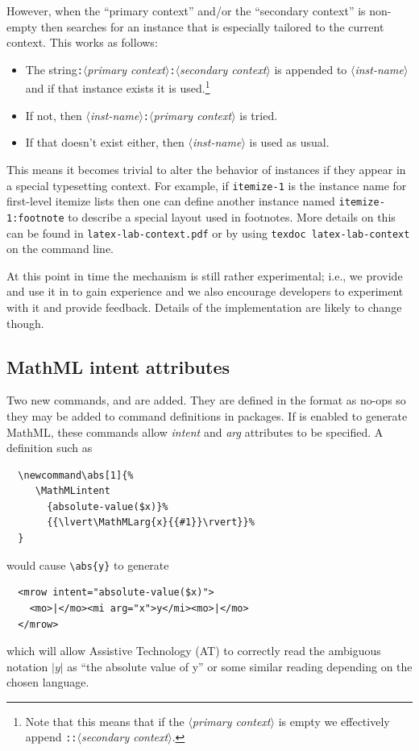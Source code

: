 \documentclass{ltnews}
\providecommand\meta[1]{$\langle$\textrm{\itshape#1}$\rangle$}
\begin{document}
However, when the \enquote{primary context} and/or the
\enquote{secondary context} is non-empty then 
searches for an instance that is especially tailored to the current
context.  This works as follows:
\begin{itemize}
\item The string\texttt{:}\meta{primary
  context}\texttt{:}\meta{secondary context} is appended to
  \meta{inst-name} and if that instance exists it is
  used.\footnote{Note that this means that if the \meta{primary
    context} is empty we effectively append \texttt{::}\meta{secondary
    context}.}
\item
  If not, then \meta{inst-name}\texttt{:}\meta{primary context} is
  tried.
\item
  If that doesn't exist either, then \meta{inst-name} is used as usual.
\end{itemize}
% 
This means it becomes trivial to alter the behavior of instances if
they appear in a special typesetting context. For example, if
\texttt{itemize-1} is the instance name for first-level itemize lists
then one can define another instance named \texttt{itemize-1:footnote}
to describe a special layout used in footnotes.  More details on this
can be found in \texttt{latex-lab-context.pdf} or by using
\verb*=texdoc latex-lab-context= on the command line.

At this point in time the mechanism is still rather experimental;
i.e., we provide and use it in  to gain experience
and we also encourage developers to experiment with it and provide
feedback. Details of the implementation are likely to change though.




\subsection{MathML intent attributes}

Two new commands,  and  are added. They
are defined in the format as no-ops so they may be added to command
definitions in packages.  If  is enabled to generate
MathML, these commands allow \emph{intent} and \emph{arg} attributes
to be specified.
%
A  definition such as
\begin{verbatim}
  \newcommand\abs[1]{%
     \MathMLintent
       {absolute-value($x)}%
       {{\lvert\MathMLarg{x}{{#1}}\rvert}}%
  }
\end{verbatim}
would cause \verb|\abs{y}| to generate
\begin{verbatim}
  <mrow intent="absolute-value($x)">
    <mo>|</mo><mi arg="x">y</mi><mo>|</mo>
  </mrow>
\end{verbatim}
which will allow Assistive Technology (AT) to correctly read the
ambiguous notation $|y|$ as \enquote{the absolute value of y} or some
similar reading depending on the chosen language.
\end{document}
